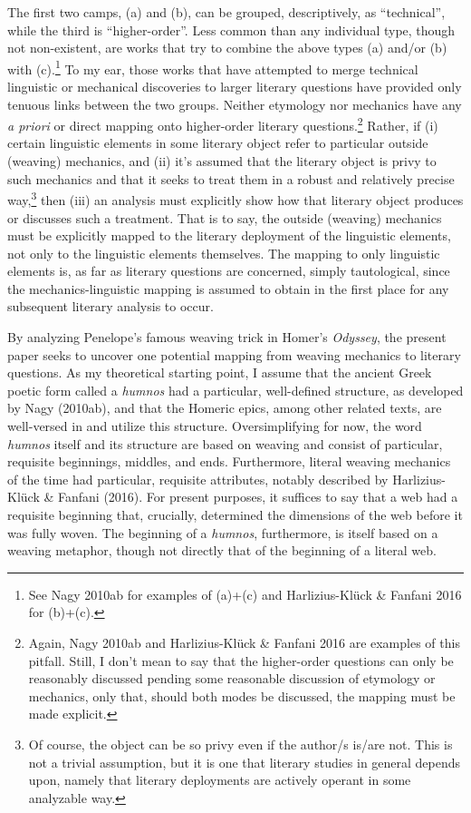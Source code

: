 \documentclass[12pt]{article}
\begin{document}
The first two camps, (a) and (b), can be grouped, descriptively, as ``technical'', while the third is ``higher-order''. Less common than any individual type, though not non-existent, are works that try to combine the above types (a) and/or (b) with (c).\footnote{ See Nagy 2010ab for examples of (a)+(c) and Harlizius-Kl\"{u}ck \& Fanfani 2016 for (b)+(c).} To my ear, those works that have attempted to merge technical linguistic or mechanical discoveries to larger literary questions have provided only tenuous links between the two groups. Neither etymology nor mechanics have any \textit{a priori} or direct mapping onto higher-order literary questions.\footnote{ Again, Nagy 2010ab and Harlizius-Kl\"{u}ck \& Fanfani 2016 are examples of this pitfall. Still, I don't mean to say that the higher-order questions can only be reasonably discussed pending some reasonable discussion of etymology or mechanics, only that, should both modes be discussed, the mapping must be made explicit.} Rather, if (i) certain linguistic elements in some literary object refer to particular outside (weaving) mechanics, and (ii) it's assumed that the literary object is privy to such mechanics and that it seeks to treat them in a robust and relatively precise way,\footnote{ Of course, the object can be so privy even if the author/s is/are not. This is not a trivial assumption, but it is one that literary studies in general depends upon, namely that literary deployments are actively operant in some analyzable way.} then (iii) an analysis must explicitly show how that literary object produces or discusses such a treatment. That is to say, the outside (weaving) mechanics must be explicitly mapped to the literary deployment of the linguistic elements, not only to the linguistic elements themselves. The mapping to only linguistic elements is, as far as literary questions are concerned, simply tautological, since the mechanics-linguistic mapping is assumed to obtain in the first place for any subsequent literary analysis to occur.

By analyzing Penelope's famous weaving trick in Homer's \textit{Odyssey}, the present paper seeks to uncover one potential mapping from weaving mechanics to literary questions. As my theoretical starting point, I assume that the ancient Greek poetic form called a \textit{humnos} had a particular, well-defined structure, as developed by Nagy (2010ab), and that the Homeric epics, among other related texts, are well-versed in and utilize this structure. Oversimplifying for now, the word \textit{humnos} itself and its structure are based on weaving and consist of particular, requisite beginnings, middles, and ends. Furthermore, literal weaving mechanics of the time had particular, requisite attributes, notably described by Harlizius-Kl\"{u}ck \& Fanfani (2016). For present purposes, it suffices to say that a web had a requisite beginning that, crucially, determined the dimensions of the web before it was fully woven. The beginning of a \textit{humnos}, furthermore, is itself based on a weaving metaphor, though not directly that of the beginning of a literal web.
\end{document}
